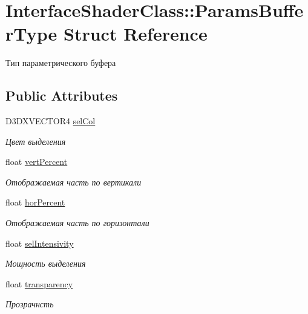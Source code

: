 \hypertarget{struct_interface_shader_class_1_1_params_buffer_type}{}\section{Interface\+Shader\+Class\+:\+:Params\+Buffer\+Type Struct Reference}
\label{struct_interface_shader_class_1_1_params_buffer_type}


Тип параметрического буфера  


\subsection*{Public Attributes}
\begin{DoxyCompactItemize}
\item 
D3\+D\+X\+V\+E\+C\+T\+O\+R4 \hyperlink{struct_interface_shader_class_1_1_params_buffer_type_a07d2eb66ed345c852f826d374fc6f31d}{sel\+Col}
\begin{DoxyCompactList}\small\item\em Цвет выделения \end{DoxyCompactList}\item 
float \hyperlink{struct_interface_shader_class_1_1_params_buffer_type_a8743d69d18051da0834ce74536d07a38}{vert\+Percent}
\begin{DoxyCompactList}\small\item\em Отображаемая часть по вертикали \end{DoxyCompactList}\item 
float \hyperlink{struct_interface_shader_class_1_1_params_buffer_type_aebc4b20b87f382f1ab8473c3660ca801}{hor\+Percent}
\begin{DoxyCompactList}\small\item\em Отображаемая часть по горизонтали \end{DoxyCompactList}\item 
float \hyperlink{struct_interface_shader_class_1_1_params_buffer_type_a64c6b2f8546b1a3ebb63547ffd2ff5b9}{sel\+Intensivity}
\begin{DoxyCompactList}\small\item\em Мощность выделения \end{DoxyCompactList}\item 
float \hyperlink{struct_interface_shader_class_1_1_params_buffer_type_a1aaa5f431e0763302845047ddceb6e6b}{transparency}
\begin{DoxyCompactList}\small\item\em Прозрачнсть \end{DoxyCompactList}\end{DoxyCompactItemize}


